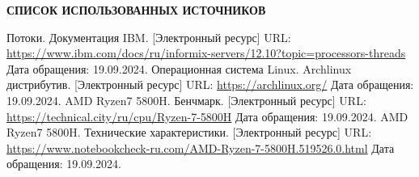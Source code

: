 \renewcommand{\bibname}{}
\begin{thebibliography}{6}
\renewcommand{\bibname}{СПИСОК ИСПОЛЬЗОВАННЫХ ИСТОЧНИКОВ}
\begin{center}
    \textbf{\bibname}
\end{center}
    Потоки. Документация IBM. [Электронный ресурс]
    URL: \url{https://www.ibm.com/docs/ru/informix-servers/12.10?topic=processors-threads}
    Дата обращения: 19.09.2024.
    Операционная система Linux. Archlinux дистрибутив. [Электронный ресурс]
    URL: \url{https://archlinux.org/}
    Дата обращения: 19.09.2024.
    AMD Ryzen7 5800H. Бенчмарк. [Электронный ресурс]
    URL: \url{https://technical.city/ru/cpu/Ryzen-7-5800H}
    Дата обращения: 19.09.2024.
    AMD Ryzen7 5800H. Технические характеристики. [Электронный ресурс]
    URL: \url{https://www.notebookcheck-ru.com/AMD-Ryzen-7-5800H.519526.0.html}
    Дата обращения: 19.09.2024.
\end{thebibliography}
